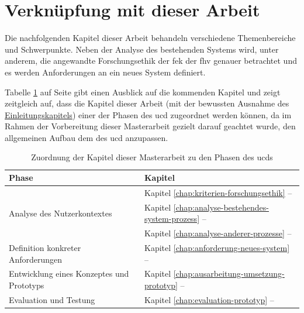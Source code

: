 \documentclass[a4paper,12pt,twoside]{scrreprt}
\begin{document}
\section{Verknüpfung mit dieser Arbeit}
\label{sec:ucd-verknüpfung-arbeit}

Die nachfolgenden Kapitel dieser Arbeit behandeln verschiedene Themenbereiche und Schwerpunkte. Neben der Analyse des bestehenden Systems wird, unter anderem, die angewandte Forschungsethik der \acl{fek} der \acl{fhv} genauer betrachtet und es werden Anforderungen an ein neues System definiert.

Tabelle \ref{tab:zurordnung-kapitel-ucd} auf Seite \pageref{tab:zurordnung-kapitel-ucd} gibt einen Ausblick auf die kommenden Kapitel und zeigt zeitgleich auf, dass die Kapitel dieser Arbeit (mit der bewussten Ausnahme des \hyperref[chap:einleitung]{Einleitungskapitels}) einer der Phasen des \acl{ucd} zugeordnet werden können, da im Rahmen der Vorbereitung dieser Masterarbeit gezielt darauf geachtet wurde, den allgemeinen Aufbau dem des \ac{ucd} anzupassen.

\begin{table}[ht]
    \centering
    \begin{tabular}{p{.35\linewidth} | p{.55\linewidth}}
        \textbf{Phase} & \textbf{Kapitel} \\ \hline
        \multirow{3}{\linewidth}{Analyse des Nutzerkontextes} & Kapitel \ref{chap:kriterien-forschungsethik} -- \nameref{chap:kriterien-forschungsethik} \\ \cline{2-2} 
         & Kapitel \ref{chap:analyse-bestehendes-system-prozess} -- \nameref{chap:analyse-bestehendes-system-prozess} \\ \cline{2-2} 
         & Kapitel \ref{chap:analyse-anderer-prozesse} -- \nameref{chap:analyse-anderer-prozesse} \\ \hline
        Definition konkreter Anforderungen & Kapitel \ref{chap:anforderung-neues-system} -- \nameref{chap:anforderung-neues-system} \\ \hline
        Entwicklung eines Konzeptes und Prototyps & Kapitel \ref{chap:ausarbeitung-umsetzung-prototyp} -- \nameref{chap:ausarbeitung-umsetzung-prototyp} \\ \hline
        Evaluation und Testung & Kapitel \ref{chap:evaluation-prototyp} -- \nameref{chap:evaluation-prototyp}
    \end{tabular}
    \caption{Zuordnung der Kapitel dieser Masterarbeit zu den Phasen des \acl{ucd}s}
    \label{tab:zurordnung-kapitel-ucd}
\end{table}
\end{document}
